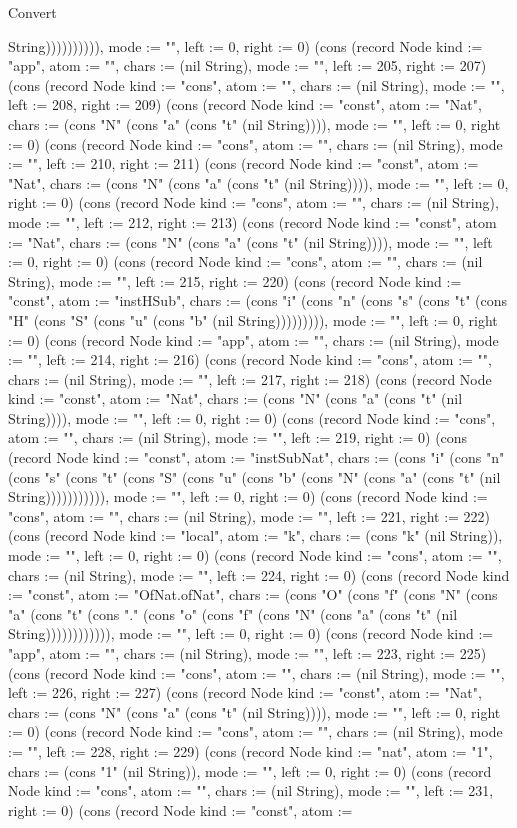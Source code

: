 \begin{lexlean}{Convert}
\begin{semanticmodule}
{String)))))))))), mode := "", left := 0, right := 0}) (cons (record Node {kind := "app", atom := "", chars := (nil String), mode := "", left := 205, right := 207}) (cons (record Node {kind := "cons", atom := "", chars := (nil String), mode := "", left := 208, right := 209}) (cons (record Node {kind := "const", atom := "Nat", chars := (cons "N" (cons "a" (cons "t" (nil String)))), mode := "", left := 0, right := 0}) (cons (record Node {kind := "cons", atom := "", chars := (nil String), mode := "", left := 210, right := 211}) (cons (record Node {kind := "const", atom := "Nat", chars := (cons "N" (cons "a" (cons "t" (nil String)))), mode := "", left := 0, right := 0}) (cons (record Node {kind := "cons", atom := "", chars := (nil String), mode := "", left := 212, right := 213}) (cons (record Node {kind := "const", atom := "Nat", chars := (cons "N" (cons "a" (cons "t" (nil String)))), mode := "", left := 0, right := 0}) (cons (record Node {kind := "cons", atom := "", chars := (nil String), mode := "", left := 215, right := 220}) (cons (record Node {kind := "const", atom := "instHSub", chars := (cons "i" (cons "n" (cons "s" (cons "t" (cons "H" (cons "S" (cons "u" (cons "b" (nil String))))))))), mode := "", left := 0, right := 0}) (cons (record Node {kind := "app", atom := "", chars := (nil String), mode := "", left := 214, right := 216}) (cons (record Node {kind := "cons", atom := "", chars := (nil String), mode := "", left := 217, right := 218}) (cons (record Node {kind := "const", atom := "Nat", chars := (cons "N" (cons "a" (cons "t" (nil String)))), mode := "", left := 0, right := 0}) (cons (record Node {kind := "cons", atom := "", chars := (nil String), mode := "", left := 219, right := 0}) (cons (record Node {kind := "const", atom := "instSubNat", chars := (cons "i" (cons "n" (cons "s" (cons "t" (cons "S" (cons "u" (cons "b" (cons "N" (cons "a" (cons "t" (nil String))))))))))), mode := "", left := 0, right := 0}) (cons (record Node {kind := "cons", atom := "", chars := (nil String), mode := "", left := 221, right := 222}) (cons (record Node {kind := "local", atom := "k", chars := (cons "k" (nil String)), mode := "", left := 0, right := 0}) (cons (record Node {kind := "cons", atom := "", chars := (nil String), mode := "", left := 224, right := 0}) (cons (record Node {kind := "const", atom := "OfNat.ofNat", chars := (cons "O" (cons "f" (cons "N" (cons "a" (cons "t" (cons "." (cons "o" (cons "f" (cons "N" (cons "a" (cons "t" (nil String)))))))))))), mode := "", left := 0, right := 0}) (cons (record Node {kind := "app", atom := "", chars := (nil String), mode := "", left := 223, right := 225}) (cons (record Node {kind := "cons", atom := "", chars := (nil String), mode := "", left := 226, right := 227}) (cons (record Node {kind := "const", atom := "Nat", chars := (cons "N" (cons "a" (cons "t" (nil String)))), mode := "", left := 0, right := 0}) (cons (record Node {kind := "cons", atom := "", chars := (nil String), mode := "", left := 228, right := 229}) (cons (record Node {kind := "nat", atom := "1", chars := (cons "1" (nil String)), mode := "", left := 0, right := 0}) (cons (record Node {kind := "cons", atom := "", chars := (nil String), mode := "", left := 231, right := 0}) (cons (record Node {kind := "const", atom := }
\end{semanticmodule}
\end{lexlean}

